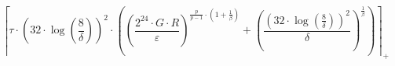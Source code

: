 \[\left\lceil \tau \cdot \left(32 \cdot \log\left(\frac{8}{\delta}\right)\right)^{2} \cdot \left(\left(\frac{2^{24} \cdot G \cdot R}{\varepsilon}\right)^{\frac{p}{p - 1} \cdot \left(1 + \frac{1}{\beta}\right)} + \left(\frac{\left(32 \cdot \log\left(\frac{8}{\delta}\right)\right)^{2}}{\delta}\right)^{\frac{1}{\beta}}\right) \right\rceil_{+}\]
